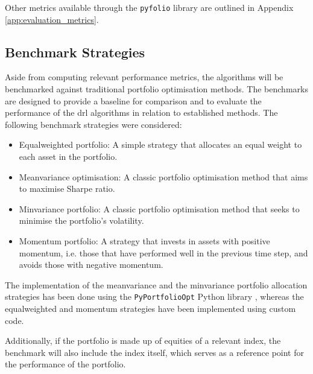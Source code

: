 Other metrics available through the \texttt{pyfolio} library are outlined in Appendix \ref{app:evaluation_metrics}.

\subsection{Benchmark Strategies} \label{sec:benchmark-strategies}

Aside from computing relevant performance metrics, the algorithms will be benchmarked against traditional portfolio optimisation methods. The benchmarks are designed to provide a baseline for comparison and to evaluate the performance of the \acrshort{drl} algorithms in relation to established methods. The following benchmark strategies were considered:
\begin{itemize}
    \item Equal\-weighted portfolio: A simple strategy that allocates an equal weight to each asset in the portfolio.
    \item Mean\-variance optimisation: A classic portfolio optimisation method that aims to maximise Sharpe ratio. 
    \item Min\-variance portfolio: A classic portfolio optimisation method that seeks to minimise the portfolio's volatility. 
    \item Momentum portfolio: A strategy that invests in assets with positive momentum, i.e. those that have performed well in the previous time step, and avoids those with negative momentum.
\end{itemize}

The implementation of the mean\-variance and the min\-variance portfolio allocation strategies has been done using the \texttt{PyPortfolioOpt} Python library \cite{Martin2021}, whereas the equal\-weighted and momentum strategies have been implemented using custom code. 

Additionally, if the portfolio is made up of equities of a relevant index, the benchmark will also include the index itself, which serves as a reference point for the performance of the portfolio. 
